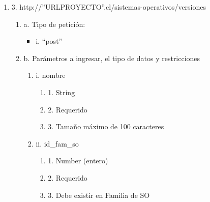 \begin{enumerate}
    \item 3. http://”URLPROYECTO”.cl/sistemas-operativos/versiones
    \begin{enumerate}
        \item a. Tipo de petición:
            \begin{itemize}
               \item i. “post”
            \end{itemize}
        \item b. Parámetros a ingresar, el tipo de datos y restricciones
            \begin{enumerate}
                \item i. nombre
                    \begin{enumerate}
                        \item 1. String
                        \item 2. Requerido
                        \item 3. Tamaño máximo de 100 caracteres
                    \end{enumerate}
                \item ii. id\_fam\_so
                    \begin{enumerate}
                        \item 1. Number (entero)
                        \item 2. Requerido
                        \item 3. Debe existir en Familia de SO
                    \end{enumerate}
            \end{enumerate}
    \end{enumerate}


\end{enumerate}
